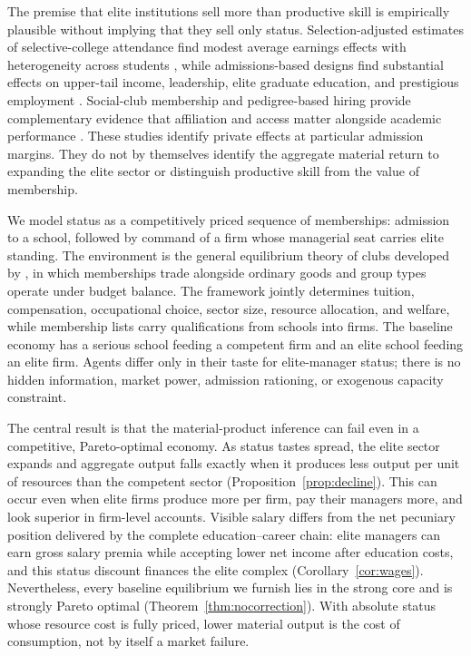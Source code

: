 \documentclass[12pt,letterpaper]{article}
\theoremstyle{definition}
\begin{document}
The premise that elite institutions sell more than productive skill is empirically
plausible without implying that they sell only status.
Selection-adjusted estimates of selective-college attendance find modest average earnings
effects with heterogeneity across students \citep{dalekrueger2002}, while admissions-based
designs find substantial effects on upper-tail income, leadership, elite graduate
education, and prestigious employment \citep{zimmerman2019elite,chettydemingfriedman2026}.
Social-club membership and pedigree-based hiring provide complementary evidence that
affiliation and access matter alongside academic performance
\citep{michelmanpricezimmerman2022,rivera2015pedigree}.
These studies identify private effects at particular admission margins.
They do not by themselves identify the aggregate material return to expanding the elite
sector or distinguish productive skill from the value of membership.

We model status as a competitively priced sequence of memberships: admission to a school,
followed by command of a firm whose managerial seat carries elite standing.
The environment is the general equilibrium theory of clubs developed by
\citet{ellickson1999clubs,ellickson2001clubs,ellickson2006organization}, in which
memberships trade alongside ordinary goods and group types operate under budget balance.
The framework jointly determines tuition, compensation, occupational choice, sector size,
resource allocation, and welfare, while membership lists carry qualifications from
schools into firms.
The baseline economy has a serious school feeding a competent firm and an elite school
feeding an elite firm.
Agents differ only in their taste for elite-manager status; there is no hidden
information, market power, admission rationing, or exogenous capacity constraint.

The central result is that the material-product inference can fail even in a competitive,
Pareto-optimal economy.
As status tastes spread, the elite sector expands and aggregate output falls exactly when
it produces less output per unit of resources than the competent sector
(Proposition~\ref{prop:decline}).
This can occur even when elite firms produce more per firm, pay their managers more, and
look superior in firm-level accounts.
Visible salary differs from the net pecuniary position delivered by the complete
education--career chain: elite managers can earn gross salary premia while accepting lower
net income after education costs, and this status discount finances the elite complex
(Corollary~\ref{cor:wages}).
Nevertheless, every baseline equilibrium we furnish lies in the strong core and is
strongly Pareto optimal (Theorem~\ref{thm:nocorrection}).
With absolute status whose resource cost is fully priced, lower material output is the
cost of consumption, not by itself a market failure.
\end{document}

